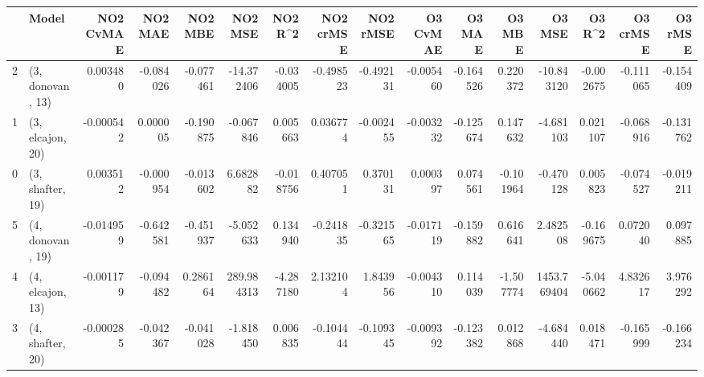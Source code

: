 \begin{tabular}{llrrrrrrrrrrrrrr}
\toprule
{} &             Model &  NO2 CvMAE &   NO2 MAE &   NO2 MBE &     NO2 MSE &   NO2 R\textasciicircum2 &  NO2 crMSE &  NO2 rMSE &  O3 CvMAE &    O3 MAE &    O3 MBE &       O3 MSE &    O3 R\textasciicircum2 &  O3 crMSE &   O3 rMSE \\
\midrule
2 &  (3, donovan, 13) &   0.003480 & -0.084026 & -0.077461 &  -14.372406 & -0.034005 &  -0.498523 & -0.492131 & -0.005460 & -0.164526 &  0.220372 &   -10.843120 & -0.002675 & -0.111065 & -0.154409 \\
1 &  (3, elcajon, 20) &  -0.000542 &  0.000005 & -0.190875 &   -0.067846 &  0.005663 &   0.036774 & -0.002455 & -0.003232 & -0.125674 &  0.147632 &    -4.681103 &  0.021107 & -0.068916 & -0.131762 \\
0 &  (3, shafter, 19) &   0.003512 & -0.000954 & -0.013602 &    6.682882 & -0.018756 &   0.407051 &  0.370131 &  0.000397 &  0.074561 & -0.101964 &    -0.470128 &  0.005823 & -0.074527 & -0.019211 \\
5 &  (4, donovan, 19) &  -0.014959 & -0.642581 & -0.451937 &   -5.052633 &  0.134940 &  -0.241835 & -0.321565 & -0.017119 & -0.159882 &  0.616641 &     2.482508 & -0.169675 &  0.072040 &  0.097885 \\
4 &  (4, elcajon, 13) &  -0.001179 & -0.094482 &  0.286164 &  289.984313 & -4.287180 &   2.132104 &  1.843956 & -0.004310 &  0.114039 & -1.507774 &  1453.769404 & -5.040662 &  4.832617 &  3.976292 \\
3 &  (4, shafter, 20) &  -0.000285 & -0.042367 & -0.041028 &   -1.818450 &  0.006835 &  -0.104444 & -0.109345 & -0.009392 & -0.123382 &  0.012868 &    -4.684440 &  0.018471 & -0.165999 & -0.166234 \\
\bottomrule
\end{tabular}
